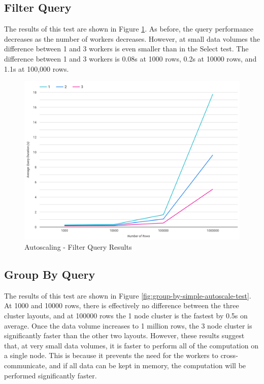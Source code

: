 \subsection{Filter Query}
The results of this test are shown in Figure \ref{fig:filter-simple-autoscale-test}. As before, the query performance decreases as the number of workers decreases. However, at small data volumes the difference between 1 and 3 workers is even smaller than in the Select test. The difference between 1 and 3 workers is 0.08s at 1000 rows, 0.2s at 10000 rows, and 1.1s at 100,000 rows.

\begin{figure}[ht]
	\centering
	\includegraphics[width=0.8\linewidth]{chapters/diagrams/testing/filter-simple-autoscale-test}
	\caption{Autoscaling - Filter Query Results}
	\label{fig:filter-simple-autoscale-test}
\end{figure}

\subsection{Group By Query}
The results of this test are shown in Figure \ref{fig:group-by-simple-autoscale-test}. At 1000 and 10000 rows, there is effectively no difference between the three cluster layouts, and at 100000 rows the 1 node cluster is the fastest by 0.5s on average. Once the data volume increases to 1 million rows, the 3 node cluster is significantly faster than the other two layouts. However, these results suggest that, at very small data volumes, it is faster to perform all of the computation on a single node. This is because it prevents the need for the workers to cross-communicate, and if all data can be kept in memory, the computation will be performed significantly faster.

